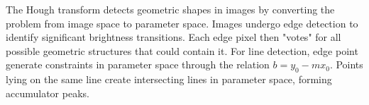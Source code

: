 The Hough transform detects geometric shapes in images by converting the problem from image space to parameter space. Images undergo edge detection to identify significant brightness transitions. Each edge pixel then "votes" for all possible geometric structures that could contain it. For line detection, edge point generate constraints in parameter space through the relation $b = y_0 - mx_0$. Points lying on the same line create intersecting lines in parameter space, forming accumulator peaks. 
